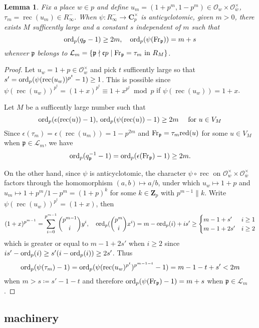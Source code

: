 \documentclass[leqno]{amsart}
\newtheorem{lem}[thm]{Lemma}
\theoremstyle{definition}
\theoremstyle{remark}
\newcommand{\oo}{\mathcal{O}}
\newcommand{\Zp}{\mathbf{Z}_p}
\newcommand{\C}{\mathbf C}
\DeclareMathOperator{\rec}{rec}
\newcommand{\Fr}{\textnormal{Fr}} %
\newcommand{\fc}{\mathfrak{c}}
\newcommand{\fp}{\mathfrak{p}}
\newcommand{\red}{\textnormal{red}}
\newcommand{\bw}{\overline{w}}
\newcommand{\ord}{\textnormal{ord}} %
\begin{document}
\begin{lem}\label{lem:estimate}
Fix a place $w\in p$ and
define $u_m=(1+p^m,1-p^m)\in \oo_w\times \oo_{\bw}^\times$,
$\tau_m=\rec(u_m)\in R_\infty^-$.
When $\psi\colon R_\infty^-\to \C_p^\times$
is anticyclotomic,
given $m>0$,
there exists  $M$ sufficently large
and a constant  $s$ independent of  $m$
such that 
\[
	\ord_p(q_\fp-1)\geq 2m,\quad
	\ord_p(\psi(\Fr_\fp))=m+s
\]
whenver $\fp$ belongs to 
$\mathcal{L}_m=
\{\fp\nmid \fc p\mid \Fr_\fp=\tau_m \text{ in } R_M\}$.
\end{lem}
\begin{proof}
Let $u_w=1+p\in \oo_w^\times$
and pick $t$ sufficently large so that
$s'=\ord_p(\psi(\rec(u_w))^{p^t}-1)\geq 1$.
This is possible since
$\psi(\rec(u_w))^{p^t}=(1+x)^{p^t}\equiv 
1+x^{p^t}\bmod p$ if
$\psi(\rec(u_w))=1+x$.

Let $M$ be a sufficently large number such that
\[
	\ord_p(\epsilon(\rec(u))-1),\,
	\ord_p(\psi(\rec(u))-1)\geq 2m\quad
	\text{ for } u\in V_{M}
\]
Since 
$\epsilon(\tau_m)=\epsilon(\rec(u_m))=1-p^{2m}$
and $\Fr_\fp=\tau_m\red(u)$ for some $u\in V_M$
when $\fp\in \mathcal{L}_m$, we have 
\[
\ord_p(q_\fp^{-1}-1)=
\ord_p(\epsilon(\Fr_\fp)-1)\geq 2m.
\]

On the other hand,
since $\psi$ is anticyclotomic, the character
$\psi\circ \rec$ on $\oo_w^\times\times\oo_{\bw}^\times$
factors through the homomorphism $(a,b)\mapsto a/b$,
under which
$u_w\mapsto 1+p$ and
$u_m\mapsto 1+p^m/1-p^m=(1+p)^k$
for some $k\in \Zp$ with $p^{m-1}\parallel k$. 
Write $\psi(\rec(u_w))^{p^t}=(1+x)$, then
\[
	(1+x)^{p^{m-1}}=\sum_{i=0}^{p^{m-1}}
	\binom{p^{m-1}}{i}y^i,\quad
	\ord_p(\binom{p^m}{i}x^i)=m-\ord_p(i)+is'\geq
	\begin{cases}
		m-1+s'& i\geq 1\\
		m-1+2s' & i\geq 2
	\end{cases}
\]
which is greater or equal to $m-1+2s'$ when  $i\geq 2$
since  $is'-\ord_p(i)\geq s'(i-\ord_p(i))\geq 2s'$.
Thus 
\[
\ord_p(\psi(\tau_m)-1)=\ord_p(\psi(\rec(u_w)^{p^t})^{p^{m-1-t}}-1)
=m-1-t+s'<2m
\]
when $m>s\coloneqq s'-1-t$
and therefore
$\ord_p(\psi(\Fr_\fp)-1)=m+s$ when  $\fp\in\mathcal{L}_m$.
\end{proof}





\subsection{machinery}
\end{document}
